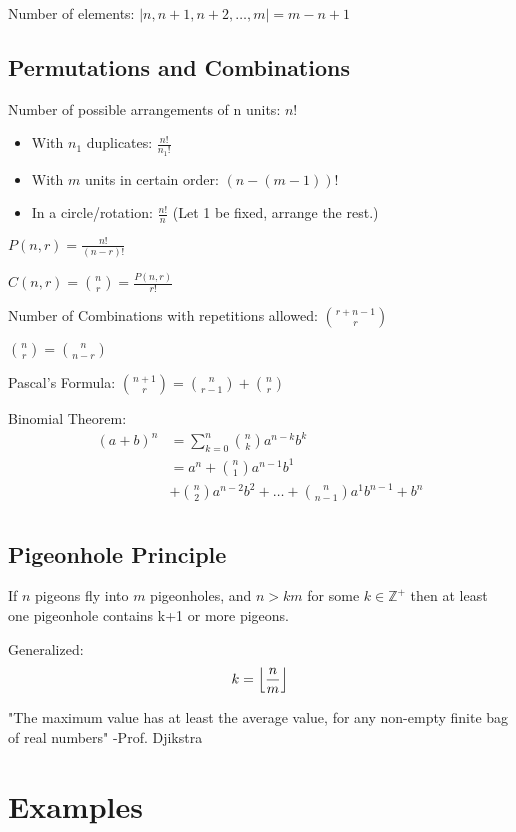 \documentclass[landscape, letterpaper, 8pt]{extarticle}
\DeclarePairedDelimiter{\floor}{\lfloor}{\rfloor}
\begin{document}
\begin{multicols}{3}
    Number of elements: $|{n, n+1, n+2, \ldots, m}| = m - n + 1$
    \subsection*{Permutations and Combinations}
    Number of possible arrangements of n units: $n!$
    \begin{itemize}[noitemsep,nolistsep]
        \item With $n_1$ duplicates: $\frac{n!}{n_1!}$
        \item With $m$ units in certain order: $(n-(m-1))!$
        \item In a circle/rotation: $\frac{n!}{n}$ (Let 1 be fixed, arrange the rest.)
    \end{itemize}

    $P(n, r) = \frac{n!}{(n-r)!}$

    $C(n, r) = \binom{n}{r} = \frac{P(n, r)}{r!}$

    Number of Combinations with repetitions allowed: $\binom{r+n-1}{r}$

    $\binom{n}{r} = \binom{n}{n-r}$

    Pascal's Formula: $\binom{n+1}{r} = \binom{n}{r-1}+ \binom{n}{r}$

    Binomial Theorem:\begin{align*}
        (a+b)^n & = \sum_{k=0}^n\binom{n}{k} a^{n-k}b^k                                  \\
                & = a^n + \binom{n}{1} a^{n-1} b^1                                       \\
                & + \binom{n}{2} a^{n-2} b^2 + \ldots + \binom{n}{n-1} a^1 b^{n-1} + b^n \\
    \end{align*}
    \subsection*{Pigeonhole Principle}
    If $n$ pigeons fly into $m$ pigeonholes, and $n > km$ for some $k \in \mathbb{Z}^+$ then at least one pigeonhole contains k+1 or more pigeons.

    Generalized: $$k = \floor*{\frac{n}{m}}$$

    "The maximum value has at least the average value, for any non-empty finite bag of real numbers" -Prof. Djikstra
    \section*{Examples}
    \newtheorem{example}{Example}

\end{multicols}
\end{document}

